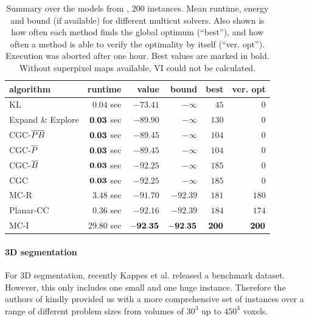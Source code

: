 \begin{table}
\centering
\scriptsize
\label{tab:experiments-yarkony-2d-2d}
\begin{tabular}{lrrrrr}
\toprule
           algorithm &         runtime       &           value &           bound &       best &   ver. opt   \\ \midrule 
                  KL & $         0.04$ sec & $       -73.41$ & $      -\infty$ & $      45$ & $       0$ \\
    Expand \& Explore & $    {\bf0.03}$ sec & $       -89.90$ & $      -\infty$ & $     130$ & $       0$ \\ 
       CGC-${\overline{PB}}$ & $   {\bf0.03}$ sec & $       -89.45$ & $      -\infty$ & $     104$ & $       0$ \\ 
        CGC-${\overline{P}}$ & $   {\bf0.03}$ sec & $       -89.45$ & $      -\infty$ & $     104$ & $      0$ \\ 
        CGC-${\overline{B}}$ & $   {\bf0.03}$ sec & $       -92.25$ & $      -\infty$ & $     185$ & $       0$ \\ 
       CGC           & $     {\bf0.03}$ sec & $       -92.25$ & $      -\infty$ & $     185$ & $       0$ \\ 
\cmidrule{1-1} 
                MC-R & $         3.48$ sec & $       -91.70$ & $       -92.39$ & $     181$ & $     180$ \\
           Planar-CC & $         0.36$ sec & $       -92.16$ & $       -92.39$ & $     184$ & $     174$ \\  
\cmidrule{1-1} 
                MC-I & $        29.80$ sec & $       {\bf-92.35}$ & $       \bf{-92.35}$ & $     {\bf200}$ & $     {\bf200}$ \\ 

\bottomrule
\end{tabular}
\caption{
Summary over the models from \cite{yarkony_2012_eccv},
200 instances. 
Mean runtime, energy and bound (if available) for different multicut solvers.
Also shown is how often each method finds the global optimum (``best''),
and how often a method is able to verify the optimality by itself
(``ver. opt'').
Execution was aborted after one hour.
Best values are marked in bold.
Without superpixel maps available, VI could not be
calculated.
}
\end{table}


\paragraph{3D segmentation}
For 3D segmentation, recently Kappes et al.
\cite{kappes_2013_benchmark_cvpr} released a benchmark dataset. However,
this only includes one small and one huge instance. Therefore
the authors of \cite{kroeger_2012_eccv} kindly provided us
with a more comprehensive set of instances
over a range of different problem sizes from volumes of $30^3$ up to 
$450^3$ voxels.


